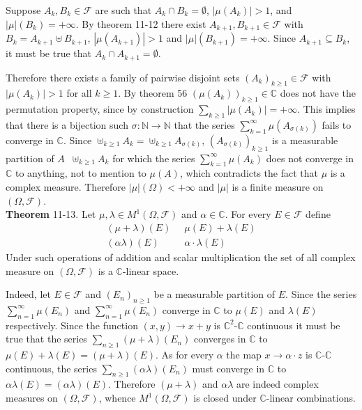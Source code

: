 \documentclass[a4paper]{article}
\newcommand{\brac}[1]{\left ( #1 \right )}
\newcommand{\abs}[1]{\left | #1 \right |}
\newcommand{\Cplx}{\mathbb{C}}
\newcommand{\Fcal}{\mathcal{F}}
\newcommand{\defn}{\mathop{\overset{\Delta}{=}}\nolimits}
\begin{document}
Suppose $A_k,B_k\in \Fcal$ are such that $A_k\cap B_k = \emptyset$, $\abs{\mu\brac{A_k}}>1$, and $\abs{\mu}\brac{B_k}=+\infty$. By theorem 11-12 there exist $A_{k+1}, B_{k+1}\in \Fcal$ with $B_k = A_{k+1}\uplus B_{k+1}$, $\abs{\mu\brac{A_{k+1}}} > 1$ and $\abs{\mu}\brac{B_{k+1}}=+\infty$. Since $A_{k+1}\subseteq B_k$, it must be true that $A_k\cap A_{k+1} = \emptyset$.

Therefore there exists a family of pairwise disjoint sets $\brac{A_k}_{k\geq1}\in \Fcal$ with $\abs{\mu\brac{A_k}}>1$ for all $k\geq 1$. By theorem 56 $\brac{\mu\brac{A_k}}_{k\geq1}\in \Cplx$ does not have the permutation property, since by construction $\sum_{k\geq 1} \abs{\mu\brac{A_k}} = +\infty$. This implies that there is a bijection such $\sigma:\mathbb{N}\to\mathbb{N}$ that the series $\sum_{k=1}^\infty \mu\brac{A_{\sigma\brac{k}}}$ fails to converge in $\Cplx$. Since $\uplus_{k\geq 1} A_k = \uplus_{k\geq 1} A_{\sigma\brac{k}}$, $\brac{A_{\sigma\brac{k}}}_{k\geq 1}$ is a measurable partition of $A\defn \uplus_{k\geq 1} A_k$ for which the series $\sum_{k=1}^\infty \mu\brac{A_k}$ does not converge in $\Cplx$ to anything, not to mention to $\mu\brac{A}$, which contradicts the fact that $\mu$ is a complex measure. Therefore $\abs{\mu}\brac{\Omega}<+\infty$ and $\abs{\mu}$ is a finite measure on $\brac{\Omega, \Fcal}$.\\

\label{thm:cplx_meas_linear_space} \noindent \textbf{Theorem} 11-13.
Let $\mu, \lambda\in M^1\brac{\Omega, \Fcal}$ and $\alpha\in \Cplx$. For every $E\in \Fcal$ define\begin{align*}\brac{ \mu+\lambda }\brac{E} &\defn \mu\brac{E}+\lambda\brac{E}\\\brac{ \alpha \lambda }\brac{E} &\defn \alpha \cdot \lambda\brac{E}\end{align*} Under such operations of addition and scalar multiplication the set of all complex measure on $\brac{\Omega, \Fcal}$ is a $\Cplx$-linear space.

Indeed, let $E\in \Fcal$ and $\brac{E_n}_{n\geq 1}$ be a measurable partition of $E$. Since the series $\sum_{n=1}^\infty \mu\brac{E_n}$ and $\sum_{n=1}^\infty \mu\brac{E_n}$ converge in $\Cplx$ to $\mu\brac{E}$ and $\lambda\brac{E}$ respectively. Since the function $\brac{x,y}\to x+y$ is $\Cplx^2$-$\Cplx$ continuous it must be true that the series $\sum_{n\geq 1} \brac{ \mu+\lambda }\brac{E_n}$ converges in $\Cplx$ to $\mu\brac{E} + \lambda\brac{E} = \brac{ \mu+\lambda }\brac{E}$. As for every $\alpha$ the map $x\to \alpha \cdot z$ is $\Cplx$-$\Cplx$ continuous, the series $\sum_{n\geq 1} \brac{ \alpha\lambda }\brac{E_n}$ must converge in $\Cplx$ to $\alpha \lambda\brac{E} = \brac{ \alpha \lambda }\brac{E}$. Therefore $\brac{\mu+\lambda}$ and $\alpha \lambda$ are indeed complex measures on $\brac{\Omega, \Fcal}$, whence $M^1\brac{\Omega, \Fcal}$ is closed under $\Cplx$-linear combinations.
\end{document}
